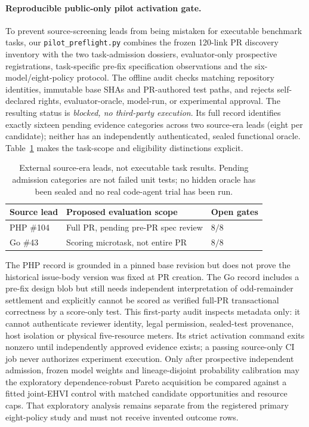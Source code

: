 \documentclass[pdflatex,sn-basic]{sn-jnl}
\begin{document}
\paragraph{Reproducible public-only pilot activation gate.}
To prevent source-screening leads from being mistaken for executable
benchmark tasks, our \texttt{pilot\_preflight.py} combines the frozen
120-link PR discovery inventory with the two task-admission dossiers,
evaluator-only prospective registrations, task-specific pre-fix
specification observations and the six-model/eight-policy protocol.
The offline audit checks matching repository identities, immutable
base SHAs and PR-authored test paths, and rejects self-declared
rights, evaluator-oracle, model-run, or experimental approval.
The resulting status is \emph{blocked, no third-party execution}.
Its full record identifies exactly sixteen pending evidence
categories across two source-era leads (eight per candidate);
neither has an independently authenticated, sealed functional oracle.
Table~\ref{tab:external-pilot-preflight} makes the task-scope and
eligibility distinctions explicit.
\begin{table}[t]
\centering
\caption{External source-era leads, not executable task results.
Pending admission categories are not failed unit tests; no hidden
oracle has been sealed and no real code-agent trial has been run.}
\label{tab:external-pilot-preflight}
\begin{tabular}{lll}
\hline
Source lead & Proposed evaluation scope & Open gates \\
\hline
PHP \#104 & Full PR, pending pre-PR spec review & $8/8$ \\
Go \#43 & Scoring microtask, not entire PR & $8/8$ \\
\hline
\end{tabular}
\end{table}
The PHP record is grounded in a pinned base revision but does not
prove the historical issue-body version was fixed at PR creation.
The Go record includes a pre-fix design blob but still needs
independent interpretation of odd-remainder settlement and
explicitly cannot be scored as verified full-PR transactional
correctness by a score-only test.
This first-party audit inspects metadata only: it cannot authenticate
reviewer identity, legal permission, sealed-test provenance, host
isolation or physical five-resource meters. Its strict activation
command exits nonzero until independently approved evidence exists;
a passing source-only CI job never authorizes experiment execution.
Only after prospective independent admission, frozen model weights
and lineage-disjoint probability calibration may the exploratory
dependence-robust Pareto acquisition be compared against a fitted
joint-EHVI control with matched candidate opportunities and resource
caps. That exploratory analysis remains separate from the registered
primary eight-policy study and must not receive invented outcome rows.
\end{document}
